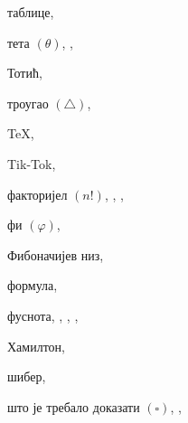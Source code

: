 \begin{theindex}
  \indexspace

  \item таблице, 
  \item тета $(\theta)$, , 
  \item Тотић, 
  \item троугао $(\triangle )$, 
  \indexskip
  \item \TeX, 
  \item Tik-Tok, 

  \indexspace

  \item факторијел $(n!)$, , , 
  \item фи $(\varphi)$, 
  \item Фибоначијев низ, 
  \item формула, 
  \item фуснота, , , 
		, 

  \indexspace

  \item Хамилтон, 

  \indexspace

  \item шибер, 
  \item што је требало доказати $(\square )$, 
		, 
\end{theindex}

\endgroup

